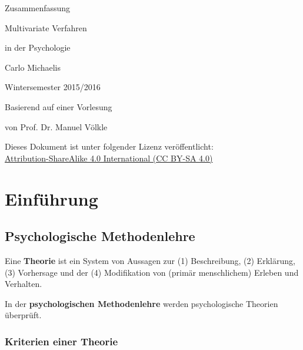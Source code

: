 \documentclass{article}
\numberwithin{equation}{section}
\begin{document}
\begin{center}

\thispagestyle{empty}

\vspace*{4cm}

\LARGE Zusammenfassung

\Huge Multivariate Verfahren

\Large in der Psychologie

\vspace*{8cm}

\large Carlo Michaelis

\large Wintersemester 2015/2016

\vspace*{0.3cm}

\normalsize Basierend auf einer Vorlesung

\normalsize von Prof. Dr. Manuel Völkle

\vfill

\normalsize{Dieses Dokument ist unter folgender Lizenz veröffentlicht:\\ \href{http://creativecommons.org/licenses/by-sa/4.0/}{Attribution-ShareAlike 4.0 International (CC BY-SA 4.0)}}


\end{center}

\newpage

\tableofcontents

\newpage


\section{Einführung}

\subsection{Psychologische Methodenlehre}

Eine \textbf{Theorie} ist ein System von Aussagen zur (1) Beschreibung, (2) Erklärung, (3) Vorhersage und der (4) Modifikation von (primär menschlichem) Erleben und Verhalten.

In der \textbf{psychologischen Methodenlehre} werden psychologische Theorien überprüft.

\subsubsection{Kriterien einer Theorie}
\end{document}
